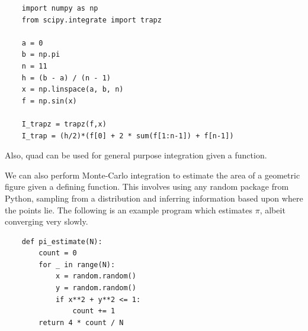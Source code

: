 \documentclass{article}
\begin{document}
\begin{verbatim}
    import numpy as np
    from scipy.integrate import trapz
    
    a = 0
    b = np.pi
    n = 11
    h = (b - a) / (n - 1)
    x = np.linspace(a, b, n)
    f = np.sin(x)
    
    I_trapz = trapz(f,x)
    I_trap = (h/2)*(f[0] + 2 * sum(f[1:n-1]) + f[n-1])
\end{verbatim}

Also, quad can be used for general purpose integration given a function.

We can also perform Monte-Carlo integration to estimate the area of a geometric figure given a defining function. This involves using any random package from Python, sampling from a distribution and inferring information based upon where the points lie. The following is an example program which estimates \(\pi\), albeit converging very slowly.

\begin{verbatim}
    def pi_estimate(N):
        count = 0
        for _ in range(N):
            x = random.random()
            y = random.random()
            if x**2 + y**2 <= 1:
                count += 1
        return 4 * count / N
\end{verbatim}
\end{document}
